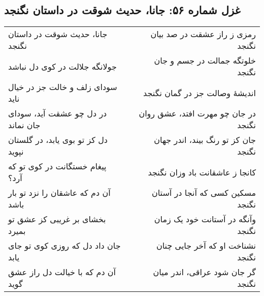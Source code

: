 \begin{center}
\section*{غزل شماره ۵۶: جانا، حدیث شوقت در داستان نگنجد}
\label{sec:056}
\begin{longtable}{l p{0.5cm} r}
جانا، حدیث شوقت در داستان نگنجد
&&
رمزی ز راز عشقت در صد بیان نگنجد
\\
جولانگه جلالت در کوی دل نباشد
&&
خلوتگه جمالت در جسم و جان نگنجد
\\
سودای زلف و خالت جز در خیال ناید
&&
اندیشهٔ وصالت جز در گمان نگنجد
\\
در دل چو عشقت آید، سودای جان نماند
&&
در جان چو مهرت افتد، عشق روان نگنجد
\\
دل کز تو بوی یابد، در گلستان نپوید
&&
جان کز تو رنگ بیند، اندر جهان نگنجد
\\
پیغام خستگانت در کوی تو که آرد؟
&&
کانجا ز عاشقانت باد وزان نگنجد
\\
آن دم که عاشقان را نزد تو بار باشد
&&
مسکین کسی که آنجا در آستان نگنجد
\\
بخشای بر غریبی کز عشق تو بمیرد
&&
وآنگه در آستانت خود یک زمان نگنجد
\\
جان داد دل که روزی کوی تو جای یابد
&&
نشناخت او که آخر جایی چنان نگنجد
\\
آن دم که با خیالت دل راز عشق گوید
&&
گر جان شود عراقی، اندر میان نگنجد
\\
\end{longtable}
\end{center}
